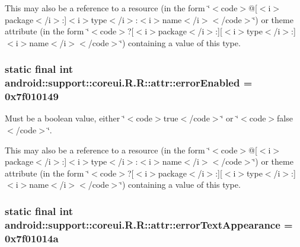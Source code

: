 This may also be a reference to a resource (in the form \char`\"{}$<$code$>$@\mbox{[}$<$i$>$package$<$/i$>$:\mbox{]}$<$i$>$type$<$/i$>$:$<$i$>$name$<$/i$>$$<$/code$>$\char`\"{}) or theme attribute (in the form \char`\"{}$<$code$>$?\mbox{[}$<$i$>$package$<$/i$>$:\mbox{]}\mbox{[}$<$i$>$type$<$/i$>$:\mbox{]}$<$i$>$name$<$/i$>$$<$/code$>$\char`\"{}) containing a value of this type. \hypertarget{classandroid_1_1support_1_1coreui_1_1_r_1_1attr_bc1a0d6d4d22ebc3cac7dc73809a0f7d}{
\subsubsection[{errorEnabled}]{\setlength{\rightskip}{0pt plus 5cm}static final int android::support::coreui.R.R::attr::errorEnabled = 0x7f010149}}
\label{classandroid_1_1support_1_1coreui_1_1_r_1_1attr_bc1a0d6d4d22ebc3cac7dc73809a0f7d}


Must be a boolean value, either \char`\"{}$<$code$>$true$<$/code$>$\char`\"{} or \char`\"{}$<$code$>$false$<$/code$>$\char`\"{}. 

This may also be a reference to a resource (in the form \char`\"{}$<$code$>$@\mbox{[}$<$i$>$package$<$/i$>$:\mbox{]}$<$i$>$type$<$/i$>$:$<$i$>$name$<$/i$>$$<$/code$>$\char`\"{}) or theme attribute (in the form \char`\"{}$<$code$>$?\mbox{[}$<$i$>$package$<$/i$>$:\mbox{]}\mbox{[}$<$i$>$type$<$/i$>$:\mbox{]}$<$i$>$name$<$/i$>$$<$/code$>$\char`\"{}) containing a value of this type. \hypertarget{classandroid_1_1support_1_1coreui_1_1_r_1_1attr_4fac1f750ee052e1eae920fde766a12d}{
\subsubsection[{errorTextAppearance}]{\setlength{\rightskip}{0pt plus 5cm}static final int android::support::coreui.R.R::attr::errorTextAppearance = 0x7f01014a}}
\label{classandroid_1_1support_1_1coreui_1_1_r_1_1attr_4fac1f750ee052e1eae920fde766a12d}


